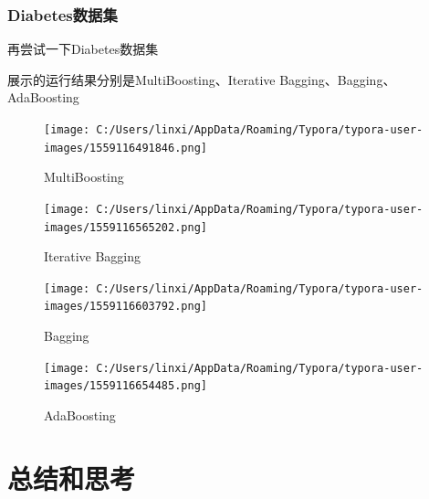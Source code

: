 \documentclass[UTF8]{ctexart}
\begin{document}
\newpage
\subsubsection{Diabetes数据集}

再尝试一下Diabetes数据集

展示的运行结果分别是MultiBoosting、Iterative Bagging、Bagging、AdaBoosting

\begin{figure}[htb]
	\centering
	\texttt{[image: C:/Users/linxi/AppData/Roaming/Typora/typora-user-images/1559116491846.png]}
	\caption{MultiBoosting}
\end{figure}

\begin{figure}[htb]
	\centering
	\texttt{[image: C:/Users/linxi/AppData/Roaming/Typora/typora-user-images/1559116565202.png]}
	\caption{Iterative Bagging}
\end{figure}

\begin{figure}[htb]
	\centering
	\texttt{[image: C:/Users/linxi/AppData/Roaming/Typora/typora-user-images/1559116603792.png]}
	\caption{Bagging}
\end{figure}

\begin{figure}[htb]
	\centering
	\texttt{[image: C:/Users/linxi/AppData/Roaming/Typora/typora-user-images/1559116654485.png]}
	\caption{AdaBoosting}
\end{figure}

\newpage
\section{总结和思考}
\end{document}
